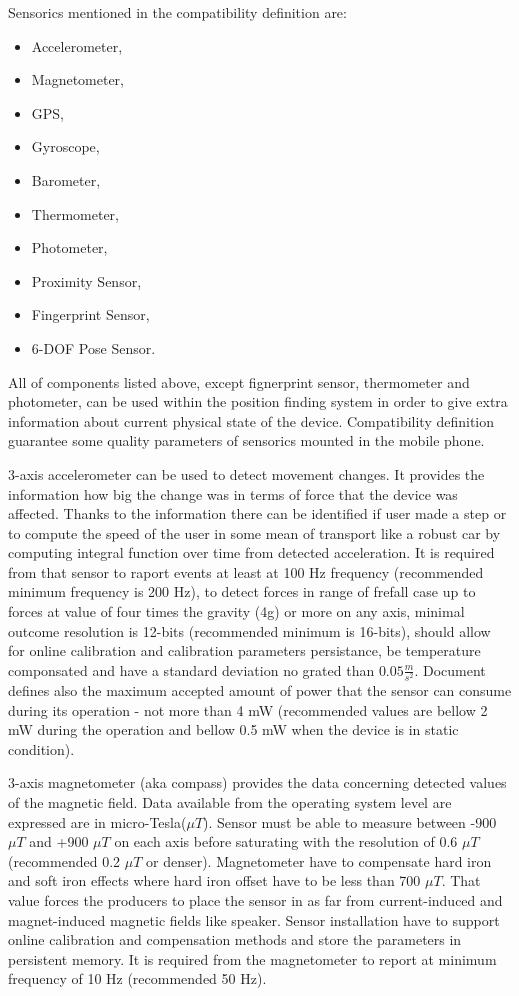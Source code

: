 \documentclass[../main.tex]{subfiles}
\begin{document}
Sensorics mentioned in the compatibility definition are:
\begin{itemize}
 	\item Accelerometer,
	\item Magnetometer,
	\item GPS,
	\item Gyroscope,
	\item Barometer,
	\item Thermometer,
	\item Photometer,
	\item Proximity Sensor,
	\item Fingerprint Sensor,
	\item 6-DOF Pose Sensor.
 \end{itemize}

All of components listed above, except fignerprint sensor, thermometer and photometer, can be used within the position finding system in order to give extra information about current physical state of the device. Compatibility definition guarantee some quality parameters of sensorics mounted in the mobile phone.

3-axis accelerometer can be used to detect movement changes. It provides the information how big the change was in terms of force that the device was affected. Thanks to the information there can be identified if user made a step or to compute the speed of the user in some mean of transport like a robust car by computing integral function over time from detected acceleration. It is required from that sensor to raport events at least at 100 Hz frequency (recommended minimum frequency is 200 Hz), to detect forces in range of frefall case up to forces at value of four times the gravity (4g) or more on any axis, minimal outcome resolution is 12-bits (recommended minimum is 16-bits), should allow for online calibration and calibration parameters persistance, be temperature componsated and have a standard deviation no grated than $ 0.05 \frac{m}{s^2} $. Document defines also the maximum accepted amount of power that the sensor can consume during its operation - not more than 4 mW (recommended values are bellow 2 mW during the operation and bellow 0.5 mW when the device is in static condition).

3-axis magnetometer (aka compass) provides the data concerning detected values of the magnetic field. Data available from the operating system level are expressed are in micro-Tesla($\mu T$). Sensor must be able to measure between -900 $\mu T$ and +900 $\mu T$ on each axis before saturating with the resolution of 0.6 $\mu T$ (recommended 0.2 $\mu T$ or denser). Magnetometer have to compensate hard iron and soft iron effects where hard iron offset have to be less than 700 $\mu T$. That value forces the producers to place the sensor in as far from current-induced and magnet-induced magnetic fields like speaker. Sensor installation have to support online calibration and compensation methods and store the parameters in persistent memory. It is required from the magnetometer to report at minimum frequency of 10 Hz (recommended 50 Hz).
\end{document}
